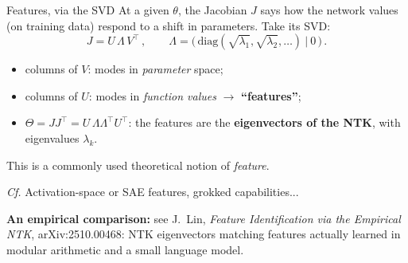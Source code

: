 \documentclass[11pt]{beamer}
\newcommand{\hl}[1]{{\color{blue!60!black}\textbf{#1}}}
\begin{document}
\begin{frame}{Features, via the SVD}
  At a given $\theta$, the Jacobian $J$ says how the network values (on
  training data) respond to a shift in parameters. Take its SVD:
  \[
    J = U\,\Lambda\, V^{\!\top}\,,\qquad
    \Lambda = \big(\,\mathrm{diag}(\sqrt{\lambda_1}, \sqrt{\lambda_2},
    \dots)\ \big|\ 0\,\big)\,.
  \] \pause
  \begin{itemize}
    \item columns of $V$: modes in \emph{parameter} space;
    \item columns of $U$: modes in \emph{function values} $\to$
      \hl{``features''};  \pause
    \item $\Theta = JJ^{\!\top} = U\,\Lambda\Lambda^{\!\top} U^{\!\top}$:
      the features are the \hl{eigenvectors of the NTK}, with
      eigenvalues $\lambda_k$.
  \end{itemize} \pause
  \vspace{2mm}

  This is a commonly used theoretical notion of \emph{feature}.
  
  \medskip
  \emph{Cf.} Activation-space or SAE features, grokked capabilities...
  \vspace{2mm}

  {\footnotesize \hl{An empirical comparison:} see J.~Lin,
  \emph{Feature Identification via the Empirical NTK},
  arXiv:2510.00468: NTK eigenvectors matching features actually learned in modular arithmetic and a small language model.}
\end{frame}
\end{document}

